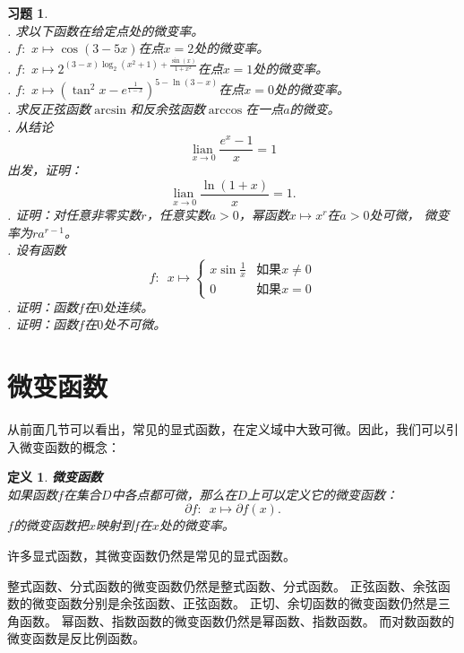 \documentclass[12pt,UTF8]{ctexbook}
\newcommand{\lian}[1]{
    \underset{#1}{\operatorname{lian}\,}
}
\newtheorem{df}{定义}[section]
\newtheorem{xt}{习题}[section]
\begin{document}
\begin{xt}
    \mbox{} \\
    . 求以下函数在给定点处的微变率。\\
    . $f: \,\, x \mapsto \cos{(3 - 5x)}$在点$x = 2$处的微变率。\\
    . $f: \,\, x \mapsto 2^{(3 - x)\log_2\left(x^2 + 1\right) + \frac{\sin(x)}{1 + x^2}}$在点$x = 1$处的微变率。\\
    . $f: \,\, x \mapsto (\tan^2{x} - e^{\frac{1}{1-x}})^{5 - \ln(3 - x)}$在点$x = 0$处的微变率。\\
    . 求反正弦函数$\arcsin$和反余弦函数$\arccos$在一点$a$的微变。\\
    . 从结论
    $$ \lian{x\to 0} \frac{e^x - 1}{x} = 1$$
    \indent 出发，证明：
    $$ \lian{x\to 0} \frac{\ln{(1 + x)}}{x} = 1.$$
    . 证明：对任意非零实数$r$，任意实数$a>0$，幂函数$x \mapsto x^r$在$a>0$处可微，
    微变率为$ra^{r-1}$。\\
    . 设有函数
    $$f: \,\,\, x \mapsto \left\{
        \begin{array}{cl}
            x\sin{\frac{1}{x}}  & \mbox{如果}x \neq 0 \\
            0 & \mbox{如果}x = 0
        \end{array}\right.
    $$
    . 证明：函数$f$在$0$处连续。\\
    . 证明：函数$f$在$0$处不可微。
\end{xt}

\section{微变函数}
从前面几节可以看出，常见的显式函数，在定义域中大致可微。因此，我们可以引入微变函数的概念：
\begin{df}{\textbf{微变函数}}\label{df:2-4-0}
    \mbox{} \\
    如果函数$f$在集合$D$中各点都可微，那么在$D$上可以定义它的微变函数：
    $$ \partial f : \,\,\, x \mapsto \partial f(x). $$
    $f$的微变函数把$x$映射到$f$在$x$处的微变率。
\end{df}

许多显式函数，其微变函数仍然是常见的显式函数。

整式函数、分式函数的微变函数仍然是整式函数、分式函数。
正弦函数、余弦函数的微变函数分别是余弦函数、正弦函数。
正切、余切函数的微变函数仍然是三角函数。
幂函数、指数函数的微变函数仍然是幂函数、指数函数。
而对数函数的微变函数是反比例函数。
\end{document}
